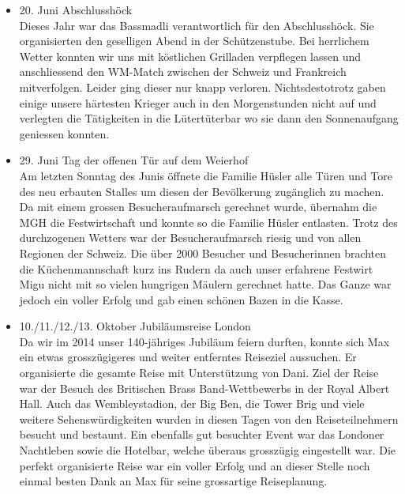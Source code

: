 \begin{history}
\begin{itemize}
        \item 20. Juni Abschlusshöck\\
              Dieses Jahr war das Bassmadli verantwortlich für den Abschlusshöck. Sie
              organisierten den geselligen Abend in der Schützenstube. Bei herrlichem
              Wetter konnten wir uns mit köstlichen Grilladen verpflegen lassen und
              anschliessend den WM-Match zwischen der Schweiz und Frankreich
              mitverfolgen. Leider ging dieser nur knapp verloren. Nichtsdestotrotz
              gaben einige unsere härtesten Krieger auch in den Morgenstunden nicht
              auf und verlegten die Tätigkeiten in die Lütertüterbar wo sie dann den
              Sonnenaufgang geniessen konnten.

        \item 29. Juni Tag der offenen Tür auf dem Weierhof\\
              Am letzten Sonntag des Junis öffnete die Familie Hüsler alle Türen und
              Tore des neu erbauten Stalles um diesen der Bevölkerung zugänglich zu
              machen. Da mit einem grossen Besucheraufmarsch gerechnet wurde, übernahm
              die MGH die Festwirtschaft und konnte so die Familie Hüsler entlasten.
              Trotz des durchzogenen Wetters war der Besucheraufmarsch riesig und von
              allen Regionen der Schweiz. Die über 2000 Besucher und Besucherinnen
              brachten die Küchenmannschaft kurz ins Rudern da auch unser erfahrene
              Festwirt Migu nicht mit so vielen hungrigen Mäulern gerechnet hatte. Das
              Ganze war jedoch ein voller Erfolg und gab einen schönen Bazen in die
              Kasse.

        \item 10./11./12./13. Oktober Jubiläumsreise London\\
              Da wir im 2014 unser 140-jähriges Jubiläum feiern durften, konnte sich
              Max ein etwas grosszügigeres und weiter entferntes Reiseziel aussuchen.
              Er organisierte die gesamte Reise mit Unterstützung von Dani. Ziel der
              Reise war der Besuch des Britischen Brass Band-Wettbewerbs in der Royal
              Albert Hall. Auch das Wembleystadion, der Big Ben, die Tower Brig und
              viele weitere Sehenswürdigkeiten wurden in diesen Tagen von den
              Reiseteilnehmern besucht und bestaunt. Ein ebenfalls gut besuchter Event
              war das Londoner Nachtleben sowie die Hotelbar, welche überaus
              grosszügig eingestellt war.  Die perfekt organisierte Reise war ein
              voller Erfolg und an dieser Stelle noch einmal besten Dank an Max für
              seine grossartige Reiseplanung.


\end{itemize}
\end{history}
